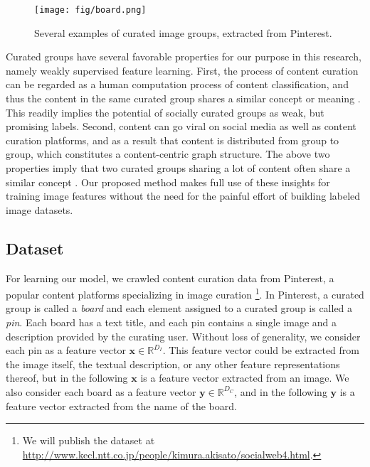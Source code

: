 \documentclass[letterpaper]{article} %
\begin{document}
\begin{figure}
  \begin{center}
    \texttt{[image: fig/board.png]}
  \end{center}
  \caption{Several examples of curated image groups, extracted from Pinterest.}
  \label{fig:board}
\end{figure}

Curated groups have several favorable properties for our purpose in this research, namely weakly supervised feature learning.
First, the process of content curation can be regarded as a human computation process of content classification, and thus the content in the same curated group shares a similar concept or meaning \cite{Zhong2015}.
This readily implies the potential of socially curated groups as weak, but promising labels.
Second, content can go viral on social media as well as content curation platforms, and as a result that content is distributed from group to group, which constitutes a content-centric graph structure.
The above two properties imply that two curated groups sharing a lot of content often share a similar concept \cite{Kimura2013}.
Our proposed method makes full use of these insights for training image features without the need for the painful effort of building labeled image datasets.

\subsection{Dataset}
\label{sec:curation:data}
\indent

\def\a{\bm{a}}
\def\b{\bm{b}}
\def\s{\bm{s}}
\def\x{\bm{x}}
\def\y{\bm{y}}
\def\z{\bm{z}}
\def\A{\bm{A}}
\def\B{\bm{B}}
\def\V{\bm{V}}
\def\W{\bm{W}}
\def\X{\bm{X}}
\def\Y{\bm{Y}}
\def\Z{\bm{Z}}
\def\bR{\mathbb R}
\def\cC{\mathcal C}
\def\cT{\mathcal T}
\def\cU{\mathcal U}
\def\cL{\mathcal L}

For learning our model, we crawled content curation data from Pinterest, a popular content platforms specializing in image curation \footnote{We will publish the dataset at \url{http://www.kecl.ntt.co.jp/people/kimura.akisato/socialweb4.html}.
}.
In Pinterest, a curated group is called a \emph{board} and each element assigned to a curated group is called a \emph{pin}.
Each board has a text title, and each pin contains a single image and a description provided by the curating user.
Without loss of generality, we consider each pin as a feature vector $\x\in\bR^{D_I}$.
This feature vector could be extracted from the image itself, the textual description, or any other feature representations thereof, but in the following $\x$ is a feature vector extracted from an image.
We also consider each board as a feature vector $\y\in\bR^{D_C}$, and in the following $\y$ is a feature vector extracted from the name of the board.
\end{document}
